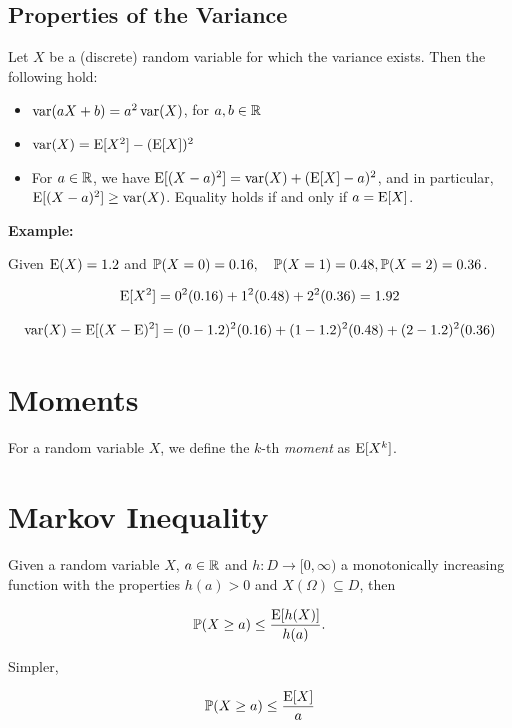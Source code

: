 \subsection{Properties of the Variance}

Let \( X \) be a (discrete) random variable for which the variance exists.  
Then the following hold:

\begin{itemize}

    \item \(\mathrm{var}(aX + b) = a^2 \, \mathrm{var}(X)\), for \( a, b \in \mathbb{R} \)
    
    \item \(\mathrm{var}(X) = \mathrm{E}[X^2] - (\mathrm{E}[X])^2\)
    
    \item For \( a \in \mathbb{R} \), we have  \(\mathrm{E}[(X - a)^2] = \mathrm{var}(X) + (\mathrm{E}[X] - a)^2\),  
    and in particular, \(\mathrm{E}[(X - a)^2] \ge \mathrm{var}(X)\).  
    Equality holds if and only if \( a = \mathrm{E}[X] \).

\end{itemize}

\textbf{Example:}

Given \(\mathrm{E}(X) = 1.2\) and \(\mathbb{P}(X = 0) = 0.16, \quad \mathbb{P}(X = 1) = 0.48, \mathbb{P}(X = 2) = 0.36\). 

\[
    \mathrm{E}[X^2] =  0^2 (0.16) + 1^2(0.48) + 2^2(0.36) = 1.92
\]

\[
    \mathrm{var}(X) = \mathrm{E}[(X - \mathrm{E})^2] = (0 - 1.2)^2 (0.16) + (1 - 1.2)^2(0.48) + (2 - 1.2)^2(0.36)
\]

\section{Moments}

For a random variable \(X\), we define the \(k\)-th \emph{moment} as \(\mathrm{E}[X^k]\).

\section{Markov Inequality}

Given a random variable \(X\), \(a \in \mathbb{R}\) and \(h: D \to [0, \infty)\) a monotonically increasing 
function with the properties \(h(a) > 0\) and \(X(\Omega) \subseteq D\), then 

\[
    \mathbb{P}(X \ge a) \le \frac{\mathrm{E}[h(X)]}{h(a)}.
\]

Simpler, 

\[
    \mathbb{P}(X \ge a) \le \frac{\mathrm{E}[X]}{a}
\]

